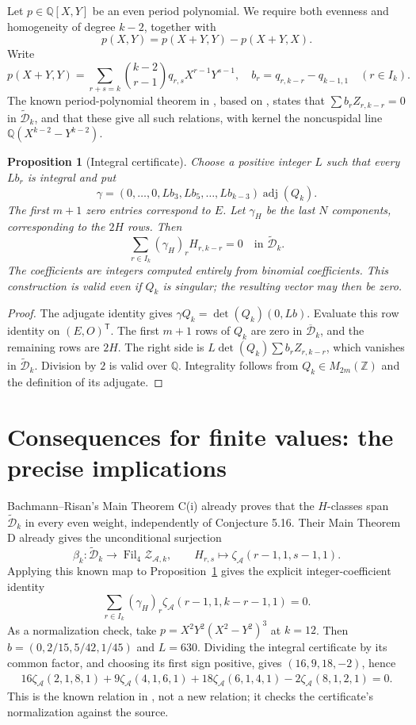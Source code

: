 \documentclass[12pt]{amsart}
\newtheorem{prop}[thm]{Proposition}
\theoremstyle{definition}
\theoremstyle{remark}
\numberwithin{equation}{section}
\newcommand{\Z}{\mathbb{Z}}
\newcommand{\Q}{\mathbb{Q}}
\newcommand{\Fil}{\operatorname{Fil}}
\newcommand{\za}{\zeta_{\mathcal A}}
\newcommand{\Dbar}{\overline{\mathcal D}_k}
\newcommand{\Dtilde}{\widetilde{\mathcal D}_k}
\newcommand{\adj}{\operatorname{adj}}
\theoremstyle{definition}
\theoremstyle{remark}
\begin{document}
Let $p\in\Q[X,Y]$ be an even period polynomial. We require both evenness and
homogeneity of degree $k-2$, together with
\[
 p(X,Y)=p(X+Y,Y)-p(X+Y,X).
\]
Write
\[
 p(X+Y,Y)=\sum_{r+s=k}\binom{k-2}{r-1}q_{r,s}X^{r-1}Y^{s-1},
 \quad b_r=q_{r,k-r}-q_{k-1,1}\quad(r\in I_k).
\]
The known period-polynomial theorem in
\cite[Proposition 5.3]{BR}, based on \cite[Theorem 3]{GKZ}, states
that $\sum b_rZ_{r,k-r}=0$ in $\Dtilde$, and that these give all such
relations, with kernel the noncuspidal line $\Q(X^{k-2}-Y^{k-2})$.

\begin{prop}[Integral certificate]\label{en:cert}
Choose a positive integer $L$ such that every $Lb_r$ is integral and put
\[
 \gamma=(0,\ldots,0,Lb_3,Lb_5,\ldots,Lb_{k-3})\adj(Q_k).
\]
The first $m+1$ zero entries correspond to $E$. Let $\gamma_H$ be the
last $N$ components, corresponding to the $2H$ rows. Then
\[
 \sum_{r\in I_k}(\gamma_H)_rH_{r,k-r}=0\quad\text{in }\Dtilde.
\]
The coefficients are integers computed entirely from binomial coefficients.
This construction is valid even if $Q_k$ is singular; the resulting
vector may then be zero.
\end{prop}
\begin{proof}
The adjugate identity gives $\gamma Q_k=\det(Q_k)(0,Lb)$.
Evaluate this row identity on $(E,O)^{\mathsf T}$. The first $m+1$ rows
of $Q_k$ are zero in $\Dbar$, and the remaining rows are $2H$.
The right side is $L\det(Q_k)\sum b_rZ_{r,k-r}$, which vanishes in
$\Dtilde$. Division by $2$ is valid over $\Q$. Integrality follows
from $Q_k\in M_{2m}(\Z)$ and the definition of its adjugate.
\end{proof}

\section{Consequences for finite values: the precise implications}
Bachmann--Risan's Main Theorem C(i) already proves that the $H$-classes
span $\Dtilde$ in every even weight, independently of Conjecture 5.16.
Their Main Theorem D already gives the unconditional surjection
\[
 \beta_k:\Dtilde\longrightarrow\Fil_4\mathcal Z_{\mathcal A,k},
 \qquad H_{r,s}\longmapsto\za(r-1,1,s-1,1).
\]
Applying this known map to Proposition~\ref{en:cert} gives the explicit
integer-coefficient identity
\begin{equation}\label{en:finitecert}
 \sum_{r\in I_k}(\gamma_H)_r\za(r-1,1,k-r-1,1)=0.
\end{equation}
As a normalization check, take $p=X^2Y^2(X^2-Y^2)^3$ at $k=12$.
Then $b=(0,2/15,5/42,1/45)$ and $L=630$. Dividing the integral
certificate by its common factor, and choosing its first sign positive,
gives $(16,9,18,-2)$, hence
\[
 \begin{split}
 16\za(2,1,8,1)+9\za(4,1,6,1)
 +18\za(6,1,4,1)-2\za(8,1,2,1)=0.
 \end{split}
\]
This is the known relation in \cite[(1.6), Example 5.18]{BR}, not a new
relation; it checks the certificate's normalization against the source.
\end{document}
